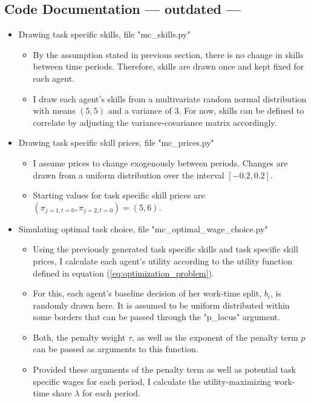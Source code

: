 \documentclass{article}
\begin{document}
\begin{appendix}


\section{Code Documentation --- outdated ---} \label{appen:code_docu} %
	\begin{itemize}
		\item{Drawing task specific skills, file "mc\_skills.py"}
		\begin{itemize}
			\item{By the assumption stated in previous section, there is no change in skills between time periods. Therefore, skills are drawn once and kept fixed for each agent.}
			\item{I draw each agent's skills from a multivariate random normal distribution with means $(5, 5)$ and a variance of 3. For now, skills can be defined to correlate by adjusting the variance-covariance matrix accordingly.}
		\end{itemize}
		\item{Drawing task specific skill prices, file "mc\_prices.py"}
		\begin{itemize}
			\item{I assume prices to change exogenously between periods. Changes are drawn from a uniform distribution over the interval $[-0.2, 0.2]$.}
			\item{Starting values for task specific skill prices are $(\pi_{j=1, t=0}, \pi_{j=2, t=0})=(5, 6)$.}
		\end{itemize}
		\item{Simulating optimal task choice, file "mc\_optimal\_wage\_choice.py"}
		\begin{itemize}
			\item{Using the previously generated task specific skills and task specific skill prices, I calculate each agent's utility according to the utility function defined in equation (\ref{eq:optimization_problem}).}
			\item{For this, each agent's baseline decision of her work-time split, $b_i$, is randomly drawn here. It is assumed to be uniform distributed within some borders that can be passed through the "p\_locus" argument.}
			\item{Both, the penalty weight $\tau$, as well as the exponent of the penalty term $p$ can be passed as arguments to this function.}
			\item{Provided these arguments of the penalty term as well as potential task specific wages for each period, I calculate the utility-maximizing work-time share $\lambda$ for each period.}

\end{itemize}
\end{itemize}
\end{appendix}
\end{document}
